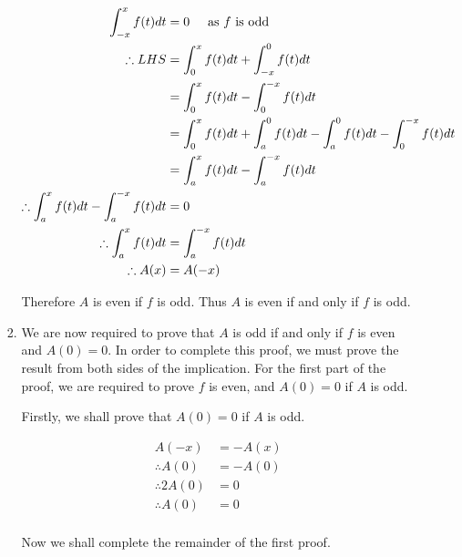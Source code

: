 \documentclass[a4paper]{article}
\begin{document}
\begin{enumerate}[label=\textbf{\arabic*.}]
\begin{enumerate}
\begin{enumerate}
		\begin{align*}
		\int_{-x}^{x}f(t)dt & = 0 \hspace{5mm} \text{as $\displaystyle{f}$ is odd}\\
		\therefore LHS & = \int_{0}^{x}f(t)dt + \int_{-x}^{0}f(t)dt\\
		& = \int_{0}^{x}f(t)dt - \int_{0}^{-x}f(t)dt\\
		& = \int_{0}^{x}f(t)dt + \int_{a}^{0}f(t)dt - \int_{a}^{0}f(t)dt - \int_{0}^{-x}f(t)dt\\
		& = \int_{a}^{x}f(t)dt - \int_{a}^{-x}f(t)dt\\
		\therefore \int_{a}^{x}f(t)dt - \int_{a}^{-x}f(t)dt & = 0\\
		\therefore \int_{a}^{x}f(t)dt & = \int_{a}^{-x}f(t)dt\\
		\therefore A(x) & = A(-x)\\
		\end{align*}

		Therefore $\displaystyle{A}$ is even if $\displaystyle{f}$ is odd. Thus $\displaystyle{A}$ is even if and only if $\displaystyle{f}$ is odd.
		
		\pagebreak

		\item We are now required to prove that $\displaystyle{A}$ is odd if and only if $\displaystyle{f}$ is even and $\displaystyle{A(0)=0}$. In order to complete this proof, we must prove the result from both sides of the implication. For the first part of the proof, we are required to prove $\displaystyle{f}$ is even, and $\displaystyle{A(0)=0}$ if $\displaystyle{A}$ is odd.

		\bigbreak

		Firstly, we shall prove that $\displaystyle{A(0)=0}$ if $\displaystyle{A}$ is odd.

		\begin{align*}
		A(-x) & = -A(x)\\
		\therefore A(0) & = -A(0)\\
		\therefore 2A(0) & = 0\\
		\therefore A(0) & = 0\\
		\end{align*}

		Now we shall complete the remainder of the first proof.


\end{enumerate}
\end{enumerate}
\end{enumerate}
\end{document}
